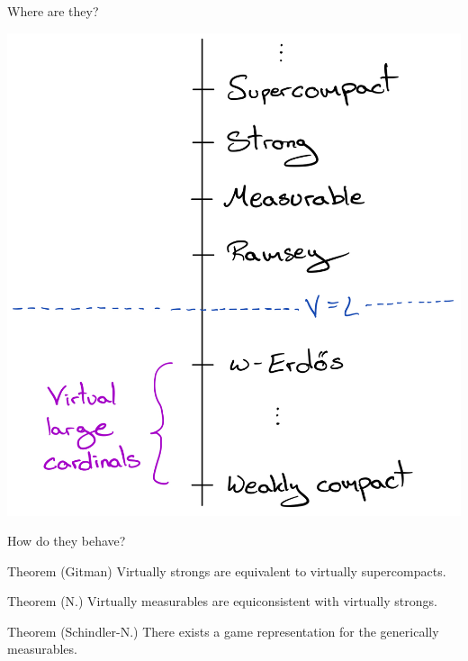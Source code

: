\documentclass{beamer}
\begin{document}
\begin{frame}{Where are they?}
  \begin{center}
    \includegraphics[scale=.16]{gfx/hierarchy.jpg}
  \end{center}
\end{frame}

\begin{frame}{How do they behave?}
  \begin{block}{Theorem (Gitman)}
    Virtually strongs are equivalent to virtually supercompacts.
  \end{block}

  \pause

  \begin{block}{Theorem (N.)}
    Virtually measurables are equiconsistent with virtually strongs.
  \end{block}

  \pause

  \begin{block}{Theorem (Schindler-N.)}
    There exists a game representation for the generically measurables.
  \end{block}
\end{frame}
\end{document}
